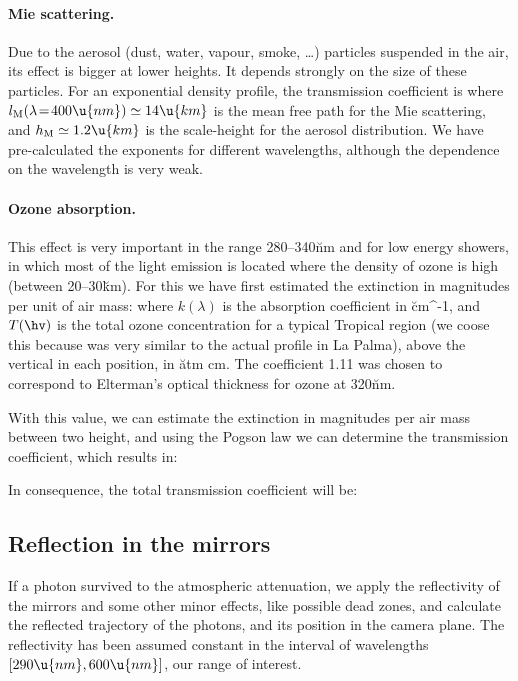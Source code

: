 \paragraph{Mie scattering.} Due to the aerosol (dust, water, vapour, 
smoke, \ldots) particles suspended in the air, its effect is bigger at
lower heights.  It depends strongly on the size of these particles.
For an exponential density profile, the transmission coefficient is
%
\Mieeq
%
where $l_{\mathrm{M}}(\lambda\!=\!400\u{nm}) \simeq 14\u{km}$ is the
mean free path for the Mie scattering, and $h_{\mathrm{M}} \simeq
1.2\u{km}$ is the scale-height for the aerosol distribution. We have
pre-calculated the exponents for different wavelengths, although the
dependence on the wavelength is very weak.
  
\paragraph{Ozone absorption.} This effect is very important in the
range 280--340\u{nm} and for low energy showers, in which most of the
\Cherenkov light emission is located where the density of ozone is
high (between 20--30\u{km}). For this we have first estimated the
extinction in magnitudes per unit of air mass:
%
\amagneq
%
where $k(\lambda)$ is the absorption coefficient in \u{cm^{-1}}, and
$T(\hv)$ is the total ozone concentration for a typical Tropical
region (we coose this because was very similar to the actual profile
in La Palma), above the vertical in each position, in \u{atm cm}. The
coefficient 1.11 was chosen to correspond to Elterman's optical
thickness for ozone at 320\u{nm}\cite{Elterman:book}.

With this value, we can estimate the extinction in magnitudes per air
mass between two height, and using the Pogson law we can determine the
transmission coefficient, which results in:
%
\Ozoneeq

In consequence, the total transmission coefficient will be:
%
\TotalTransmissioneq

\subsection{Reflection in the mirrors}

If a photon survived to the atmospheric attenuation, we apply the
reflectivity of the mirrors and some other minor effects, like
possible dead zones, and calculate the reflected trajectory of the
photons, and its position in the camera plane. The reflectivity has
been assumed constant in the interval of wavelengths
$[290\u{nm},600\u{nm}]$, our range of interest.

